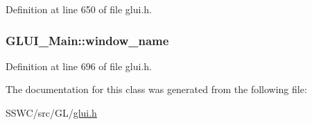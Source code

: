 Definition at line 650 of file glui.\+h.

\hypertarget{class_g_l_u_i___main_a699c852cb777273543f38506e71c9e22}{
\subsubsection[{window\+\_\+name}]{ G\+L\+U\+I\+\_\+\+Main\+::window\+\_\+name}}\label{class_g_l_u_i___main_a699c852cb777273543f38506e71c9e22}


Definition at line 696 of file glui.\+h.



The documentation for this class was generated from the following file\+:\begin{DoxyCompactItemize}
\item 
S\+S\+W\+C/src/\+G\+L/\hyperlink{glui_8h}{glui.\+h}\end{DoxyCompactItemize}
